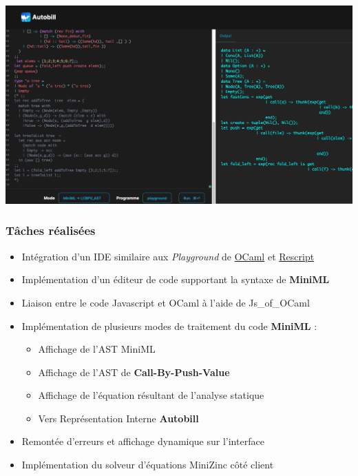 \documentclass[
  12pt,
]{article}
\providecommand{\tightlist}{%
  \setlength{\itemsep}{0pt}\setlength{\parskip}{0pt}}
\begin{document}
\includegraphics{./MarkdownVersions/Rapport/screen.png}

\hypertarget{tuxe2ches-ruxe9alisuxe9es}{%
\subsubsection{Tâches réalisées}\label{tuxe2ches-ruxe9alisuxe9es}}

\begin{itemize}
\tightlist
\item
  Intégration d'un IDE similaire aux \emph{Playground} de
  \href{https://OCaml.org/play}{OCaml} et
  \href{https://rescript-lang.org/try}{Rescript}
\item
  Implémentation d'un éditeur de code supportant la syntaxe de
  \textbf{MiniML}
\item
  Liaison entre le code Javascript et OCaml à l'aide de Js\_of\_OCaml
\item
  Implémentation de plusieurs modes de traitement du code
  \textbf{MiniML} :

  \begin{itemize}
  \tightlist
  \item
    Affichage de l'AST MiniML
  \item
    Affichage de l'AST de \textbf{Call-By-Push-Value}
  \item
    Affichage de l'équation résultant de l'analyse statique
  \item
    Vers Représentation Interne \textbf{Autobill}
  \end{itemize}
\item
  Remontée d'erreurs et affichage dynamique sur l'interface
\item
  Implémentation du solveur d'équations MiniZinc côté client
\end{itemize}
\end{document}
